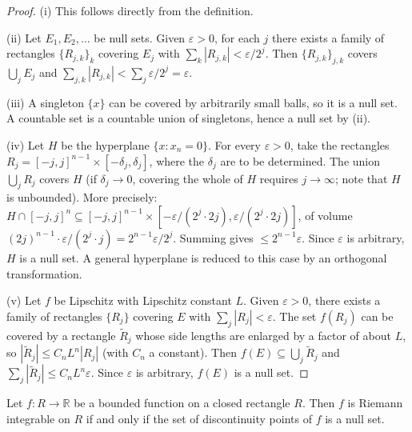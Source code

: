 \begin{proof}
(i) This follows directly from the definition.

(ii) Let $E_1, E_2, \dots$ be null sets. Given $\varepsilon > 0$, for each $j$ there exists a family of rectangles $\{R_{j,k}\}_k$ covering $E_j$ with $\sum_k |R_{j,k}| < \varepsilon / 2^j$. Then $\{R_{j,k}\}_{j,k}$ covers $\bigcup_j E_j$ and $\sum_{j,k} |R_{j,k}| < \sum_j \varepsilon / 2^j = \varepsilon$.

(iii) A singleton $\{x\}$ can be covered by arbitrarily small balls, so it is a null set. A countable set is a countable union of singletons, hence a null set by (ii).

(iv) Let $H$ be the hyperplane $\{x : x_n = 0\}$. For every $\varepsilon > 0$, take the rectangles $R_j = [-j, j]^{n-1} \times [-\delta_j, \delta_j]$, where the $\delta_j$ are to be determined. The union $\bigcup_j R_j$ covers $H$ (if $\delta_j \to 0$, covering the whole of $H$ requires $j \to \infty$; note that $H$ is unbounded). More precisely: $H \cap [-j, j]^n \subseteq [-j, j]^{n-1} \times [-\varepsilon/(2^j \cdot 2j), \varepsilon/(2^j \cdot 2j)]$, of volume $(2j)^{n-1} \cdot \varepsilon/(2^j \cdot j) = 2^{n-1} \varepsilon / 2^j$. Summing gives $\le 2^{n-1} \varepsilon$. Since $\varepsilon$ is arbitrary, $H$ is a null set. A general hyperplane is reduced to this case by an orthogonal transformation.

(v) Let $f$ be Lipschitz with Lipschitz constant $L$. Given $\varepsilon > 0$, there exists a family of rectangles $\{R_j\}$ covering $E$ with $\sum_j |R_j| < \varepsilon$. The set $f(R_j)$ can be covered by a rectangle $\tilde{R}_j$ whose side lengths are enlarged by a factor of about $L$, so $|\tilde{R}_j| \le C_n L^n |R_j|$ (with $C_n$ a constant). Then $f(E) \subseteq \bigcup_j \tilde{R}_j$ and $\sum_j |\tilde{R}_j| \le C_n L^n \varepsilon$. Since $\varepsilon$ is arbitrary, $f(E)$ is a null set.
\end{proof}

\begin{theorem}\label{thm:riemann_lebesgue_criterion}
Let $f: R \to \mathbb{R}$ be a bounded function on a closed rectangle $R$. Then $f$ is Riemann integrable on $R$ if and only if the set of discontinuity points of $f$ is a null set.
\end{theorem}

